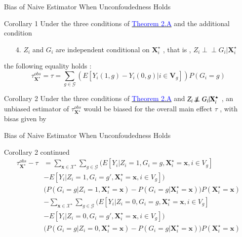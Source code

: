 \documentclass[notes,11pt, aspectratio=169]{beamer}
\begin{document}
\begin{frame}{Bias of Naive Estimator When Unconfoudedness Holds}
\begin{block}{Corollary 1}
Under the three conditions of \hyperlink{theorem2.A}{\textcolor{blue}{Theorem 2.A}} and the additional condition
\begin{enumerate}
    \item[4.] $Z_i$ and $G_i$ are independent conditional on $\mathbf{X}_{i}^\star$ , that is , $Z_i \perp\!\!\!\perp G_i |\mathbf{X}_{i}^\star$
\end{enumerate}
%
the following equality holds :
\begin{equation*}
    \tau_{\mathbf{X}^\star}^{obs}=\tau=\sum_{g \in \mathcal{G}} \left( E[Y_i(1,g)-Y_i(0,g) | i \in \mathbf{V}_g ] \right)P(G_i=g)
\end{equation*}
%
\end{block}
\begin{block}{Corollary 2}
Under the three conditions of \hyperlink{theorem2.A}{\textcolor{blue}{Theorem 2.A}} and $Z_i \not \! \perp\!\!\!\perp G_i |\mathbf{X}_{i}^\star$ , an unbiased estimator of $\tau_{\mathbf{X}^\star}^{obs}$ would be biased for the overall main effect $\tau$ , with bisas given by
%
\end{block}
\end{frame}


\begin{frame}{Bias of Naive Estimator When Unconfoudedness Holds}
\begin{block}{Corollary 2 continued}
\begin{align*}
   \tau_{\mathbf{X}^\star}^{obs}-\tau &=\sum_{\mathbf{x} \in \mathcal{X}^\star}  \sum_{g \in \mathcal{G}} \Big( E[Y_i|Z_i=1 , G_i=g , \mathbf{X}_{i}^\star =\mathbf{x}, i \in V_g]
\\ &   -E[Y_i|Z_i=1,G_i=g' , \mathbf{X}_{i}^\star =\mathbf{x} , i \in V_g]\Big)
\\ & \Big(P(G_i=g | Z_i=1,\mathbf{X}_{i}^\star=\mathbf{x}) - P(G_i=g | \mathbf{X}_{i}^\star=\mathbf{x})   \Big)  P(\mathbf{X}_{i}^\star=\mathbf{x})
\\ & - \sum_{\mathbf{x} \in \mathcal{X}^\star}  \sum_{g \in \mathcal{G}} \Big(E[Y_i|Z_i=0 , G_i=g , \mathbf{X}_{i}^\star =\mathbf{x}, i \in V_g]
\\  &  -E[Y_i|Z_i=0,G_i=g' , \mathbf{X}_{i}^\star =\mathbf{x} , i \in V_g]\Big)
\\ & \Big(P(G_i=g | Z_i=0,\mathbf{X}_{i}^\star=\mathbf{x}) - P(G_i=g | \mathbf{X}_{i}^\star=\mathbf{x})   \Big)  P(\mathbf{X}_{i}^\star=\mathbf{x})
\end{align*}
\end{block}
\end{frame}
\end{document}
